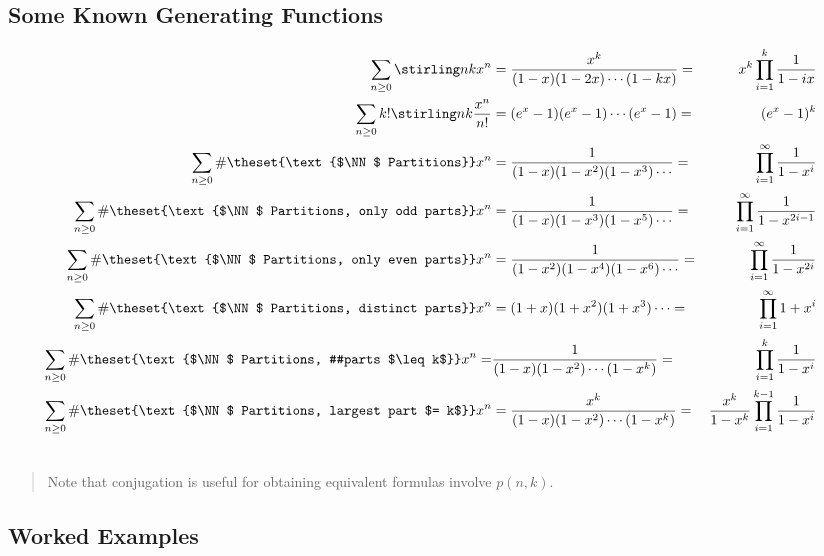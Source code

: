 \hypertarget{some-known-generating-functions}{%
\subsection{Some Known Generating
Functions}\label{some-known-generating-functions}}

\[\begin{align*}
\sum_{n\geq 0} \stirling n k x^n &= \frac{x^k}{(1-x)(1-2x)\cdots(1-kx)} =& x^k\prod_{i=1}^k \frac 1 {1-ix} \\
\sum_{n\geq 0} k! \stirling n k \frac{x^n}{n!} &= (e^x-1)(e^x-1)\cdots(e^x-1) =& (e^x-1)^k \\
\sum_{n\geq 0} \#\theset{\text{$\NN$ Partitions}} x^n &= \frac{1}{(1-x)(1-x^2)(1-x^3)\cdots} =& \prod_{i=1}^\infty \frac 1 {1-x^i} \\
\sum_{n\geq 0} \#\theset{\text{$\NN$ Partitions, only odd parts}} x^n &= \frac{1}{(1-x)(1-x^3)(1-x^5)\cdots} =& \prod_{i=1}^\infty \frac{1}{1-x^{2i-1}} \\
\sum_{n\geq 0} \#\theset{\text{$\NN$ Partitions, only even parts}} x^n &= \frac{1}{(1-x^2)(1-x^4)(1-x^6)\cdots} =& \prod_{i=1}^\infty \frac{1}{1-x^{2i}} \\
\sum_{n\geq 0} \#\theset{\text{$\NN$ Partitions, distinct parts}} x^n &= {(1+x)(1+x^2)(1+x^3)\cdots} =& \prod_{i=1}^{\infty} {1+x^i} \\
\sum_{n\geq 0} \#\theset{\text{$\NN$ Partitions, #parts $\leq k$}} x^n =& \frac{1}{(1-x)(1-x^2)\cdots(1-x^k)} =& \prod_{i=1}^{k} \frac 1 {1-x^i}  &\\
\sum_{n\geq 0} \#\theset{\text{$\NN$ Partitions, largest part $= k$}} x^n &= \frac{x^k}{(1-x)(1-x^2)\cdots(1-x^k)} =& \frac{x^k}{1-x^k}\prod_{i=1}^{k-1} \frac 1 {1-x^i} \\
\
\end{align*} 
\]

\begin{quote}
Note that conjugation is useful for obtaining equivalent formulas
involve \(p(n, k)\).
\end{quote}

\hypertarget{worked-examples}{%
\subsection{Worked Examples}\label{worked-examples}}

